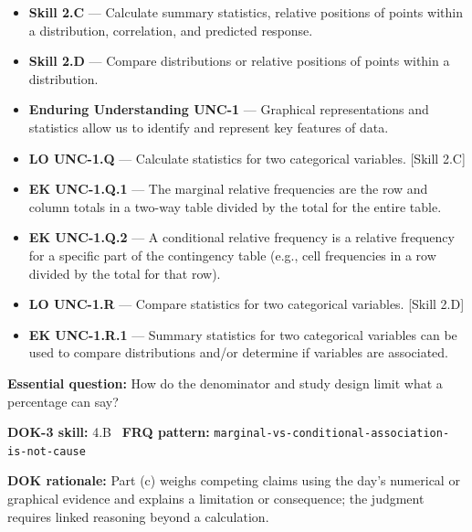 \documentclass[11pt]{article}
\begin{document}


{\small
\begin{itemize}[leftmargin=1.5em,itemsep=2pt,topsep=2pt]
  \item \textbf{Skill 2.C} --- Calculate summary statistics, relative positions of points within a distribution, correlation, and predicted response.
  \item \textbf{Skill 2.D} --- Compare distributions or relative positions of points within a distribution.
  \item \textbf{Enduring Understanding UNC-1} --- Graphical representations and statistics allow us to identify and represent key features of data.
  \item \textbf{LO UNC-1.Q} --- Calculate statistics for two categorical variables. [Skill 2.C]
  \item \textbf{EK UNC-1.Q.1} --- The marginal relative frequencies are the row and column totals in a two-way table divided by the total for the entire table.
  \item \textbf{EK UNC-1.Q.2} --- A conditional relative frequency is a relative frequency for a specific part of the contingency table (e.g., cell frequencies in a row divided by the total for that row).
  \item \textbf{LO UNC-1.R} --- Compare statistics for two categorical variables. [Skill 2.D]
  \item \textbf{EK UNC-1.R.1} --- Summary statistics for two categorical variables can be used to compare distributions and/or determine if variables are associated.
\end{itemize}
}
\textbf{Essential question:} How do the denominator and study design limit what a percentage can say?\par
\textbf{DOK-3 skill:} 4.B \textperiodcentered\ \textbf{FRQ pattern:} {\small\texttt{marginal-\allowbreak{}vs-\allowbreak{}conditional-\allowbreak{}association-\allowbreak{}is-\allowbreak{}not-\allowbreak{}cause}}\par
\textbf{DOK rationale:} Part (c) weighs competing claims using the day's numerical or graphical evidence and explains a limitation or consequence; the judgment requires linked reasoning beyond a calculation.\par
\end{document}
